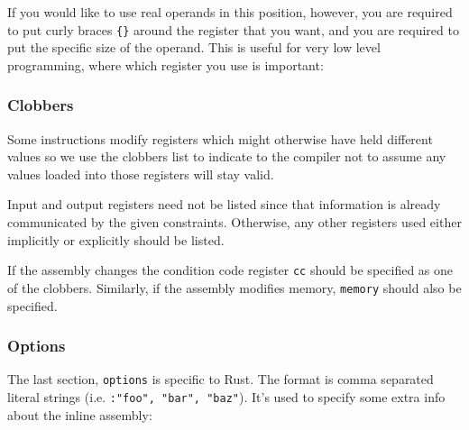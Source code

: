 \documentclass[a4paper,]{book}
\newenvironment{Shaded}{\begin{snugshade}}{\end{snugshade}}
\newcommand{\KeywordTok}[1]{\textcolor[rgb]{0.13,0.29,0.53}{\textbf{{#1}}}}
\newcommand{\StringTok}[1]{\textcolor[rgb]{0.31,0.60,0.02}{{#1}}}
\newcommand{\CommentTok}[1]{\textcolor[rgb]{0.56,0.35,0.01}{\textit{{#1}}}}
\newcommand{\OtherTok}[1]{\textcolor[rgb]{0.56,0.35,0.01}{{#1}}}
\newcommand{\NormalTok}[1]{{#1}}
\begin{document}
If you would like to use real operands in this position, however, you
are required to put curly braces \texttt{\{\}} around the register that
you want, and you are required to put the specific size of the operand.
This is useful for very low level programming, where which register you
use is important:

\begin{Shaded}
\end{Shaded}

\subsubsection{Clobbers}\label{clobbers}

Some instructions modify registers which might otherwise have held
different values so we use the clobbers list to indicate to the compiler
not to assume any values loaded into those registers will stay valid.

\begin{Shaded}
\end{Shaded}

Input and output registers need not be listed since that information is
already communicated by the given constraints. Otherwise, any other
registers used either implicitly or explicitly should be listed.

If the assembly changes the condition code register \texttt{cc} should
be specified as one of the clobbers. Similarly, if the assembly modifies
memory, \texttt{memory} should also be specified.

\subsubsection{Options}\label{options}

The last section, \texttt{options} is specific to Rust. The format is
comma separated literal strings (i.e. \texttt{:"foo",\ "bar",\ "baz"}).
It's used to specify some extra info about the inline assembly:
\end{document}
